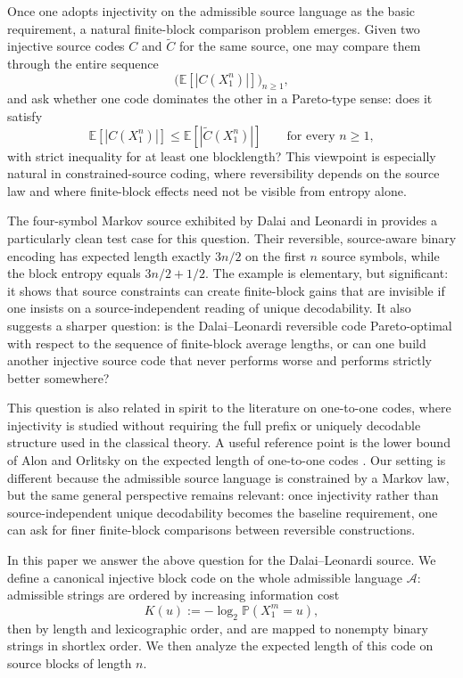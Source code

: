 \documentclass[10pt,a4paper]{article}
\theoremstyle{definition}
\theoremstyle{remark}
\newcommand{\1}{\mathbf{1}}
\newcommand{\PP}{\mathbb{P}}
\newcommand{\EE}{\mathbb{E}}
\begin{document}
Once one adopts injectivity on the admissible source language as the basic requirement, a natural finite-block comparison problem emerges. Given two injective source codes $C$ and $\widetilde C$ for the same source, one may compare them through the entire sequence
\[
\bigl(\EE[|C(X_1^n)|]\bigr)_{n\ge1},
\]
and ask whether one code dominates the other in a Pareto-type sense: does it satisfy
\[
\EE[|C(X_1^n)|]\le \EE[|\widetilde C(X_1^n)|]\qquad\text{for every }n\ge1,
\]
with strict inequality for at least one blocklength? This viewpoint is especially natural in constrained-source coding, where reversibility depends on the source law and where finite-block effects need not be visible from entropy alone.

The four-symbol Markov source exhibited by Dalai and Leonardi in \cite[Sec.~II]{DalaiLeonardi} provides a particularly clean test case for this question. Their reversible, source-aware binary encoding has expected length exactly $3n/2$ on the first $n$ source symbols, while the block entropy equals $3n/2+1/2$. The example is elementary, but significant: it shows that source constraints can create finite-block gains that are invisible if one insists on a source-independent reading of unique decodability. It also suggests a sharper question: is the Dalai--Leonardi reversible code Pareto-optimal with respect to the sequence of finite-block average lengths, or can one build another injective source code that never performs worse and performs strictly better somewhere?

This question is also related in spirit to the literature on one-to-one codes, where injectivity is studied without requiring the full prefix or uniquely decodable structure used in the classical theory. A useful reference point is the lower bound of Alon and Orlitsky on the expected length of one-to-one codes \cite{AlonOrlitsky94}. Our setting is different because the admissible source language is constrained by a Markov law, but the same general perspective remains relevant: once injectivity rather than source-independent unique decodability becomes the baseline requirement, one can ask for finer finite-block comparisons between reversible constructions.

In this paper we answer the above question for the Dalai--Leonardi source. We define a canonical injective block code on the whole admissible language $\mathcal A$: admissible strings are ordered by increasing information cost
\[
K(u):=-\log_2 \PP(X_1^m=u),
\]
then by length and lexicographic order, and are mapped to nonempty binary strings in shortlex order. We then analyze the expected length of this code on source blocks of length $n$.
\end{document}
